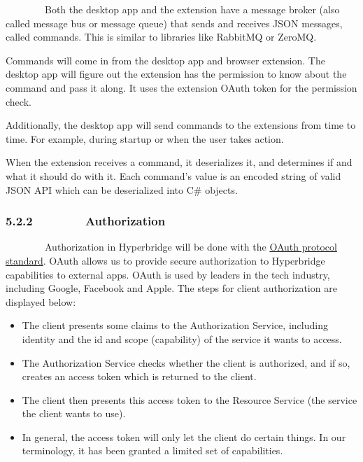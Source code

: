 \documentclass[]{article}
\providecommand{\tightlist}{%
  \setlength{\itemsep}{0pt}\setlength{\parskip}{0pt}}
\begin{document}
{~~~~~~~~Both the desktop app and the extension have a message broker
(also called message bus or message queue) that sends and receives JSON
messages, called commands. This is similar to libraries like RabbitMQ or
ZeroMQ.}

{}

{Commands will come in from the desktop app and browser extension. The
desktop app will figure out the extension has the permission to know
about the command and pass it along. It uses the extension OAuth token
for the permission check.}

{}

{Additionally, the desktop app will send commands to the extensions from
time to time. For example, during startup or when the user takes
action.}

{}

{When the extension receives a command, it deserializes it, and
determines if and what it should do with it. Each command's value is an
encoded string of valid JSON API which can be deserialized into C\#
objects.}

{}

\hypertarget{h.4z2bok2i8gzr}{%
\subsubsection{\texorpdfstring{{5.2.2~~~~~~~~Authorization}}{5.2.2~~~~~~~~Authorization}}\label{h.4z2bok2i8gzr}}

{~~~~~~~~Authorization in Hyperbridge will be done with the
}{\href{https://www.google.com/url?q=https://en.wikipedia.org/wiki/OAuth\&sa=D\&ust=1512628005820000\&usg=AFQjCNEBwzuCnBunhC20MWoqeh2KCtGjMA}{OAuth
protocol standard}}{. OAuth allows us to provide secure authorization to
Hyperbridge capabilities to external apps. OAuth is used by leaders in
the tech industry, including Google, Facebook and Apple. The steps for
client authorization are displayed below:}

\begin{itemize}
\tightlist
\item
  {The client presents some claims to the Authorization Service,
  including identity and the id and scope (capability) of the service it
  wants to access.}
\item
  {The Authorization Service checks whether the client is authorized,
  and if so, creates an access token which is returned to the client.}
\item
  {The client then presents this access token to the Resource Service
  (the service the client wants to use).}
\item
  {In general, the access token will only let the client do certain
  things. In our terminology, it has been granted a limited set of
  capabilities.}
\end{itemize}
\end{document}
